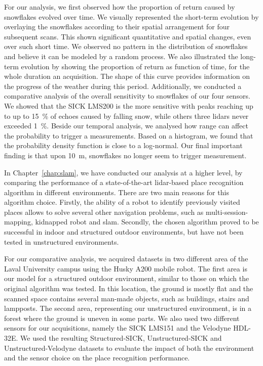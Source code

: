 For our analysis, we first observed how the proportion of return caused by snowflakes evolved over time. We visually represented the short-term evolution by overlaying the snowflakes according to their spatial arrangement for four subsequent scans. This shown significant quantitative and spatial changes, even over such short time. We observed no pattern in the distribution of snowflakes and believe it can be modeled by a random process. We also illustrated the long-term evolution by showing the proportion of return as function of time, for the whole duration an acquisition. The shape of this curve provides information on the progress of the weather during this period. Additionally, we conducted a comparative analysis of the overall sensitivity to snowflakes of our four sensors. We showed that the SICK LMS200 is the more sensitive with peaks reaching up to up to \SI{15}{\percent} of echoes caused by falling snow, while others three \gls*{lidar}s never exceeded \SI{1}{\percent}. Beside our temporal analysis, we analysed how range can affect the probability to trigger a measurements. Based on a histogram, we found that the probability density function is close to a log-normal. Our final important finding is that upon \SI{10}{\meter}, snowflakes no longer seem to trigger measurement.

In Chapter~\ref{chap:slam}, we have conducted our analysis at a higher level, by comparing the performance of a state-of-the-art \gls*{lidar}-based place recognition algorithm in different environments. There are two main reasons for this algorithm choice. Firstly, the ability of a robot to identify previously visited places allows to solve several other navigation problems, such as multi-session-mapping, kidnapped robot and \gls*{slam}. Secondly, the chosen algorithm proved to be successful in indoor and structured outdoor environments, but have not been tested in unstructured environments.

For our comparative analysis, we acquired datasets in two different area of the Laval University campus using the Husky A200 mobile robot. The first area is our model for a structured outdoor environment, similar to those on which the original algorithm was tested. In this location, the ground is mostly flat and the scanned space contains several man-made objects, such as buildings, stairs and lampposts. The second area, representing our unstructured environment, is in a forest where the ground is uneven in some parts. We also used two different sensors for our acquisitions, namely the SICK LMS151 and the Velodyne HDL-32E. We used the resulting Structured-SICK, Unstructured-SICK and Unstructured-Velodyne datasets to evaluate the impact of both the environment and the sensor choice on the place recognition performance.

